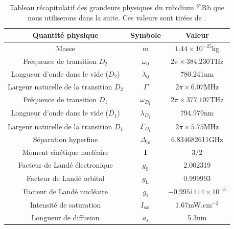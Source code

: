 \renewcommand{\arraystretch}{1.1}
\begin{table}[!ht]
\begin{center}
\begin{tabular}{ |c|c|c| }
\hline
\textbf{Quantité physique} & \textbf{Symbole} & \textbf{Valeur} \\
\hline
Masse & m & $1.44 \times 10^{-25}$kg \\
\hline
Fréquence de transition $D_2$ & $\omega_0$ & $2\pi \times 384.230$THz \\
\hline
Longueur d'onde dans le vide ($D_2$) & $\lambda_{\mathrm{0}}$ & 780.241nm \\
\hline
Largeur naturelle de la transition $D_2$ & $\Gamma$ & $2\pi \times 6.07$MHz \\
\hline
Fréquence de transition $D_1$ & $\omega_{D_1}$ & $2\pi \times 377.107$THz \\
\hline
Longueur d'onde dans le vide ($D_1$) & $\lambda_{D_1}$ & 794.979nm \\
\hline
Largeur naturelle de la transition $D_1$ & $\Gamma_{D_1}$ & $2\pi \times 5.75$MHz \\
\hline
Séparation hyperfine & $\Delta_{\mathrm{hf}}$ & 6.834682611GHz \\
\hline
Moment cinétique nucléaire & $\mathbf{I}$ & $3/2$ \\
\hline
Facteur de Landé électronique & $g_{\mathrm{S}}$ & 2.002319 \\
\hline
Facteur de Landé orbital & $g_{\mathrm{L}}$ & 0.999993\\
\hline
Facteur de Landé nucléaire & $g_{\mathrm{I}}$ & $-0.9951414 \times 10^{-3}$ \\
\hline
Intensité de saturation & $I_{\mathrm{sat}}$ & 1.67mW.cm${}^{-2}$ \\
\hline
Longueur de diffusion & $a_{\mathrm{s}}$ & 5.3nm \\
\hline
\end{tabular}
\end{center}
\caption{Tableau récapitulatif des grandeurs physiques du rubidium ${}^{87}$Rb que nous utiliserons dans la suite. Ces valeurs sont tirées de \citep{steck2001rubidium}.}
\label{tbl:Rb87}
\end{table}

